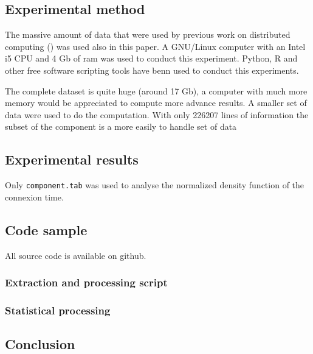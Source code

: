 \documentclass{sig-alternate-10pt}
\begin{document}
\subsection{Experimental method}

The massive amount of data that were used by previous work on distributed computing (\cite{ja_ko_mascots09})
was used also in this paper. A GNU/Linux computer with an Intel i5 CPU and 4 Gb of ram was used to conduct this
experiment. Python, R and other free software scripting tools have benn used to conduct this experiments.

The complete dataset is quite huge (around 17 Gb), a computer with much more memory would be appreciated to
compute more advance results. A smaller set of data were used to do the computation. With only 226207 lines 
of information the subset of the component is a more easily to handle set of data

\subsection{Experimental results}

Only \texttt{component.tab} was used to analyse the normalized density function of the connexion time.


\subsection{Code sample}

All source code is available on github.

\subsubsection{Extraction and processing script}



\subsubsection{Statistical processing}






\subsection{Conclusion}
\end{document}

